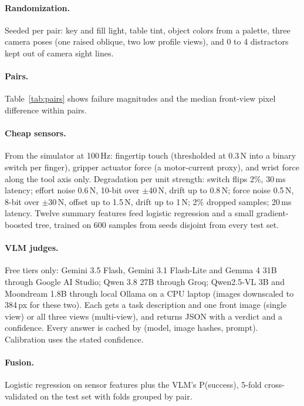 \documentclass[10pt,twocolumn]{article}
\begin{document}
\paragraph{Randomization.} Seeded per pair: key and fill light, table tint, object colors from a palette, three camera poses (one raised oblique, two low profile views), and 0 to 4 distractors kept out of camera sight lines.
\paragraph{Pairs.} Table~\ref{tab:pairs} shows failure magnitudes and the median front-view pixel difference within pairs.
\begin{table}[t]\centering\small\caption{Scaled set: minimal pairs per task.}\label{tab:pairs}\end{table}
\paragraph{Cheap sensors.} From the simulator at 100\,Hz: fingertip touch (thresholded at 0.3\,N into a binary switch per finger), gripper actuator force (a motor-current proxy), and wrist force along the tool axis only. Degradation per unit strength: switch flips 2\%, 30\,ms latency; effort noise 0.6\,N, 10-bit over $\pm$40\,N, drift up to 0.8\,N; force noise 0.5\,N, 8-bit over $\pm$30\,N, offset up to 1.5\,N, drift up to 1\,N; 2\% dropped samples; 20\,ms latency. Twelve summary features feed logistic regression and a small gradient-boosted tree, trained on 600 samples from seeds disjoint from every test set.
\paragraph{VLM judges.} Free tiers only: Gemini 3.5 Flash, Gemini 3.1 Flash-Lite and Gemma 4 31B through Google AI Studio; Qwen 3.8 27B through Groq; Qwen2.5-VL 3B and Moondream 1.8B through local Ollama on a CPU laptop (images downscaled to 384\,px for these two). Each gets a task description and one front image (single view) or all three views (multi-view), and returns JSON with a verdict and a confidence. Every answer is cached by (model, image hashes, prompt). Calibration uses the stated confidence.
\paragraph{Fusion.} Logistic regression on sensor features plus the VLM's P(success), 5-fold cross-validated on the test set with folds grouped by pair.
\end{document}
